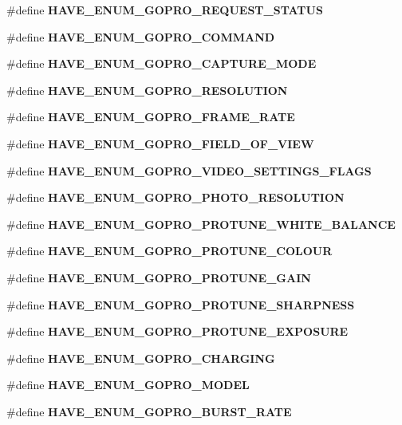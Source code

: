 \begin{DoxyCompactItemize}
\item 
\#define \textbf{ H\+A\+V\+E\+\_\+\+E\+N\+U\+M\+\_\+\+G\+O\+P\+R\+O\+\_\+\+R\+E\+Q\+U\+E\+S\+T\+\_\+\+S\+T\+A\+T\+US}
\item 
\#define \textbf{ H\+A\+V\+E\+\_\+\+E\+N\+U\+M\+\_\+\+G\+O\+P\+R\+O\+\_\+\+C\+O\+M\+M\+A\+ND}
\item 
\#define \textbf{ H\+A\+V\+E\+\_\+\+E\+N\+U\+M\+\_\+\+G\+O\+P\+R\+O\+\_\+\+C\+A\+P\+T\+U\+R\+E\+\_\+\+M\+O\+DE}
\item 
\#define \textbf{ H\+A\+V\+E\+\_\+\+E\+N\+U\+M\+\_\+\+G\+O\+P\+R\+O\+\_\+\+R\+E\+S\+O\+L\+U\+T\+I\+ON}
\item 
\#define \textbf{ H\+A\+V\+E\+\_\+\+E\+N\+U\+M\+\_\+\+G\+O\+P\+R\+O\+\_\+\+F\+R\+A\+M\+E\+\_\+\+R\+A\+TE}
\item 
\#define \textbf{ H\+A\+V\+E\+\_\+\+E\+N\+U\+M\+\_\+\+G\+O\+P\+R\+O\+\_\+\+F\+I\+E\+L\+D\+\_\+\+O\+F\+\_\+\+V\+I\+EW}
\item 
\#define \textbf{ H\+A\+V\+E\+\_\+\+E\+N\+U\+M\+\_\+\+G\+O\+P\+R\+O\+\_\+\+V\+I\+D\+E\+O\+\_\+\+S\+E\+T\+T\+I\+N\+G\+S\+\_\+\+F\+L\+A\+GS}
\item 
\#define \textbf{ H\+A\+V\+E\+\_\+\+E\+N\+U\+M\+\_\+\+G\+O\+P\+R\+O\+\_\+\+P\+H\+O\+T\+O\+\_\+\+R\+E\+S\+O\+L\+U\+T\+I\+ON}
\item 
\#define \textbf{ H\+A\+V\+E\+\_\+\+E\+N\+U\+M\+\_\+\+G\+O\+P\+R\+O\+\_\+\+P\+R\+O\+T\+U\+N\+E\+\_\+\+W\+H\+I\+T\+E\+\_\+\+B\+A\+L\+A\+N\+CE}
\item 
\#define \textbf{ H\+A\+V\+E\+\_\+\+E\+N\+U\+M\+\_\+\+G\+O\+P\+R\+O\+\_\+\+P\+R\+O\+T\+U\+N\+E\+\_\+\+C\+O\+L\+O\+UR}
\item 
\#define \textbf{ H\+A\+V\+E\+\_\+\+E\+N\+U\+M\+\_\+\+G\+O\+P\+R\+O\+\_\+\+P\+R\+O\+T\+U\+N\+E\+\_\+\+G\+A\+IN}
\item 
\#define \textbf{ H\+A\+V\+E\+\_\+\+E\+N\+U\+M\+\_\+\+G\+O\+P\+R\+O\+\_\+\+P\+R\+O\+T\+U\+N\+E\+\_\+\+S\+H\+A\+R\+P\+N\+E\+SS}
\item 
\#define \textbf{ H\+A\+V\+E\+\_\+\+E\+N\+U\+M\+\_\+\+G\+O\+P\+R\+O\+\_\+\+P\+R\+O\+T\+U\+N\+E\+\_\+\+E\+X\+P\+O\+S\+U\+RE}
\item 
\#define \textbf{ H\+A\+V\+E\+\_\+\+E\+N\+U\+M\+\_\+\+G\+O\+P\+R\+O\+\_\+\+C\+H\+A\+R\+G\+I\+NG}
\item 
\#define \textbf{ H\+A\+V\+E\+\_\+\+E\+N\+U\+M\+\_\+\+G\+O\+P\+R\+O\+\_\+\+M\+O\+D\+EL}
\item 
\#define \textbf{ H\+A\+V\+E\+\_\+\+E\+N\+U\+M\+\_\+\+G\+O\+P\+R\+O\+\_\+\+B\+U\+R\+S\+T\+\_\+\+R\+A\+TE}
\item 

\end{DoxyCompactItemize}
